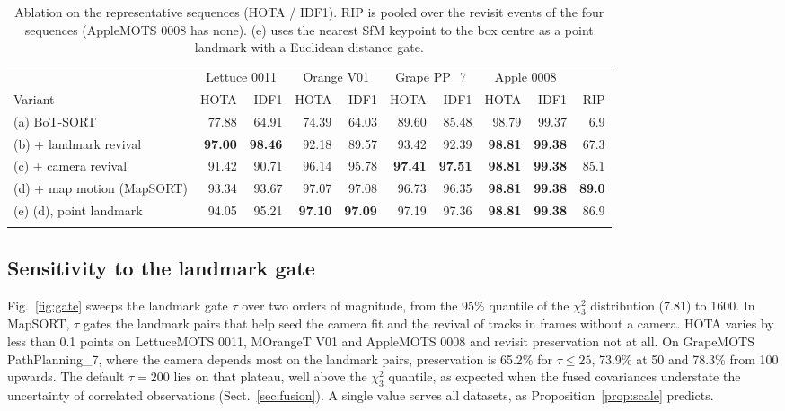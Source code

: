 \documentclass[pdflatex,sn-basic]{sn-jnl}%
\theoremstyle{thmstyleone}%
\begin{document}
\begin{table}[t]
\caption{Ablation on the representative sequences (HOTA / IDF1). RIP is pooled over the revisit events of the four sequences (AppleMOTS 0008 has none). (e) uses the nearest SfM keypoint to the box centre as a point landmark with a Euclidean distance gate.}\label{tab:ablation}
\scriptsize
\setlength{\tabcolsep}{1.6pt}
\begin{tabular*}{\textwidth}{@{\extracolsep\fill}lrrrrrrrrr@{}}
\toprule
 & \multicolumn{2}{c}{Lettuce 0011} & \multicolumn{2}{c}{Orange V01} & \multicolumn{2}{c}{Grape PP\_7} & \multicolumn{2}{c}{Apple 0008} & \\
\cmidrule(lr){2-3}\cmidrule(lr){4-5}\cmidrule(lr){6-7}\cmidrule(lr){8-9}
Variant & HOTA & IDF1 & HOTA & IDF1 & HOTA & IDF1 & HOTA & IDF1 & RIP \\
\midrule
(a) BoT-SORT & 77.88 & 64.91 & 74.39 & 64.03 & 89.60 & 85.48 & 98.79 & 99.37 & 6.9 \\
(b) + landmark revival & \textbf{97.00} & \textbf{98.46} & 92.18 & 89.57 & 93.42 & 92.39 & \textbf{98.81} & \textbf{99.38} & 67.3 \\
(c) + camera revival & 91.42 & 90.71 & 96.14 & 95.78 & \textbf{97.41} & \textbf{97.51} & \textbf{98.81} & \textbf{99.38} & 85.1 \\
(d) + map motion (MapSORT) & 93.34 & 93.67 & 97.07 & 97.08 & 96.73 & 96.35 & \textbf{98.81} & \textbf{99.38} & \textbf{89.0} \\
(e) (d), point landmark & 94.05 & 95.21 & \textbf{97.10} & \textbf{97.09} & 97.19 & 97.36 & \textbf{98.81} & \textbf{99.38} & 86.9 \\
\botrule
\end{tabular*}
\end{table}

\subsection{Sensitivity to the landmark gate}\label{sec:res-gate}

Fig.~\ref{fig:gate} sweeps the landmark gate $\tau$ over two orders of magnitude, from the 95\% quantile of the $\chi^2_3$ distribution (7.81) to 1600. In MapSORT, $\tau$ gates the landmark pairs that help seed the camera fit and the revival of tracks in frames without a camera. HOTA varies by less than 0.1 points on LettuceMOTS 0011, MOrangeT V01 and AppleMOTS 0008 and revisit preservation not at all. On GrapeMOTS PathPlanning\_7, where the camera depends most on the landmark pairs, preservation is 65.2\% for $\tau\le25$, 73.9\% at 50 and 78.3\% from 100 upwards. The default $\tau=200$ lies on that plateau, well above the $\chi^2_3$ quantile, as expected when the fused covariances understate the uncertainty of correlated observations (Sect.~\ref{sec:fusion}). A single value serves all datasets, as Proposition~\ref{prop:scale} predicts.
\end{document}
